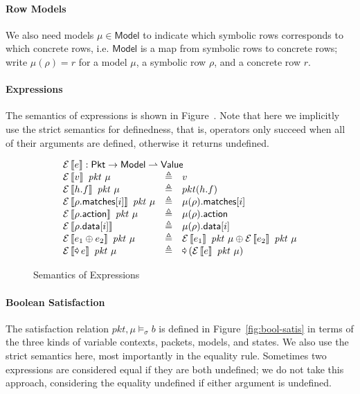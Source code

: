 \documentclass{article}
\newcommand{\pkt}{\mathit{pkt}}
\newcommand{\denote}[1]{\left\llbracket#1\right\rrbracket}
\newcommand{\edenote}[1]{\mathcal{E}\denote{#1}}
\newcommand{\binop}{\mathbin{\oplus}}
\newcommand{\unop}{\mathop{\text{\pointer}}}
\newcommand{\Value}{\mathsf{Value}}
\newcommand{\Pkt}{\mathsf{Pkt}}
\newcommand{\Model}{\mathsf{Model}}
\newcommand{\matches}{\mathsf{matches}}
\newcommand{\action}{\mathsf{action}}
\newcommand{\data}{\mathsf{data}}
\begin{document}
\paragraph{Row Models}
We also need models $\mu \in \Model$ to indicate which symbolic rows corresponds
to which concrete rows, i.e. $\Model$ is a map from symbolic rows to concrete
rows; write $\mu(\rho) = r$ for a model $\mu$, a symbolic row $\rho$, and a
concrete row $r$.

\paragraph{Expressions}
The semantics of expressions is shown in Figure~\label{fig:sem-expr}. Note that
here we implicitly use the strict semantics for definedness, that is, operators
only succeed when all of their arguments are defined, otherwise it returns
undefined.

\begin{figure}[H]
  \[\begin{array}{l>{\triangleq}cl}
  \multicolumn{3}{l}{\edenote{e} : \Pkt \to \Model \rightharpoonup \Value }\\
    \edenote{v}~\pkt~\mu &&
    v \\
    \edenote{h.f}~\pkt~\mu &&
    pkt(h.f)\\
    \edenote{\rho.\matches[i]}~\pkt~\mu &&
    \mu(\rho).\matches[i] \\
    \edenote{\rho.\action}~\pkt~\mu &&
    \mu(\rho).\action \\
    \edenote{\rho.\data[i]} &&
    \mu(\rho).\data[i]\\
    \edenote{e_1 \binop e_2}~\pkt~\mu&&
    \edenote{e_1}~\pkt~\mu \binop
    \edenote{e_2}~\pkt~\mu \\
    \edenote{\unop e}~\pkt~\mu &&
    \unop \left(\edenote{e}~\pkt~\mu\right)
  \end{array}
  \]
  \caption{Semantics of Expressions}
  \label{fig:sem-expr}
\end{figure}

\paragraph{Boolean Satisfaction}
The satisfaction relation $\pkt,\mu \models_\sigma b$ is defined in
Figure~\ref{fig:bool-satis} in terms of the three kinds of variable contexts,
packets, models, and states. We also use the strict semantics here, most
importantly in the equality rule. Sometimes two expressions are considered equal
if they are both undefined; we do not take this approach, considering the
equality undefined if either argument is undefined.
\end{document}
